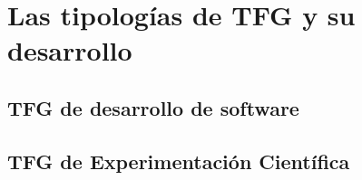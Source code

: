 \chapter{Las tipologías de TFG y su desarrollo}
\label{cap:Tipologías}




\section{TFG de desarrollo de software} %
\section{TFG de Experimentación Científica} %


